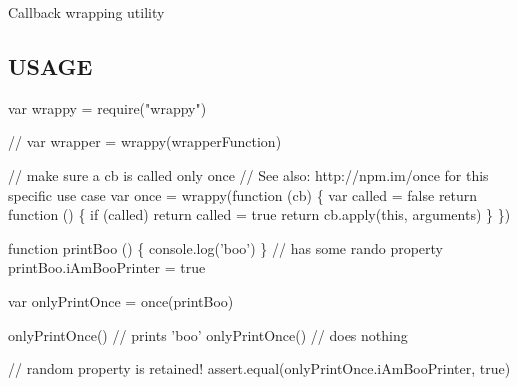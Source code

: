 Callback wrapping utility

\subsection*{U\+S\+A\+GE}


\begin{DoxyCode}
var wrappy = require("wrappy")

// var wrapper = wrappy(wrapperFunction)

// make sure a cb is called only once
// See also: http://npm.im/once for this specific use case
var once = wrappy(function (cb) \{
  var called = false
  return function () \{
    if (called) return
    called = true
    return cb.apply(this, arguments)
  \}
\})

function printBoo () \{
  console.log('boo')
\}
// has some rando property
printBoo.iAmBooPrinter = true

var onlyPrintOnce = once(printBoo)

onlyPrintOnce() // prints 'boo'
onlyPrintOnce() // does nothing

// random property is retained!
assert.equal(onlyPrintOnce.iAmBooPrinter, true)
\end{DoxyCode}
 